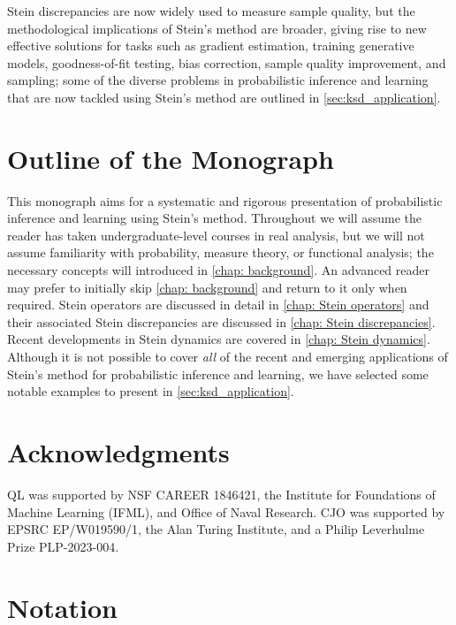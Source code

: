 \documentclass[12pt,paper=letter]{scrreprt}
\begin{document}
Stein discrepancies are now widely used to measure sample quality, but the methodological implications of Stein's method are broader, giving rise to new effective solutions for tasks such as gradient estimation, training generative models, goodness-of-fit testing, bias correction, sample quality improvement, and sampling; some of the diverse problems in probabilistic inference and learning that are now tackled using Stein's method are outlined in \cref{sec:ksd_application}.



\section{Outline of the Monograph}

This monograph aims for a systematic and rigorous presentation of probabilistic inference and learning using Stein's method.
Throughout we will assume the reader has taken undergraduate-level courses in real analysis, but we will not assume familiarity with probability, measure theory, or functional analysis; the necessary concepts will introduced in \cref{chap: background}.
An advanced reader may prefer to initially skip \cref{chap: background} and return to it only when required.
Stein operators are discussed in detail in \cref{chap: Stein operators} and their associated Stein discrepancies are discussed in \cref{chap: Stein discrepancies}.
Recent developments in Stein dynamics are covered in \cref{chap: Stein dynamics}.
Although it is not possible to cover \emph{all} of the recent and emerging applications of Stein's method for probabilistic inference and learning, we have selected some notable examples to present in \cref{sec:ksd_application}.



\section{Acknowledgments}

QL was supported by NSF CAREER 1846421, the Institute for Foundations of Machine Learning (IFML), and Office of Naval Research.  
CJO was supported by EPSRC EP/W019590/1, the Alan Turing Institute, and a Philip Leverhulme Prize PLP-2023-004.










\section{Notation}
\end{document}
